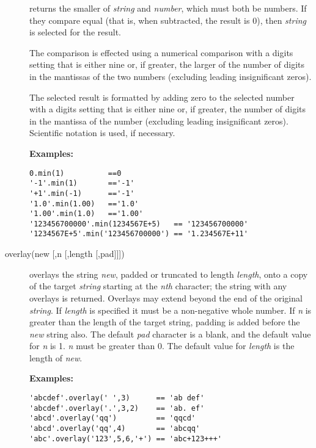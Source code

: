 \begin{description}
returns the smaller of \emph{string} and \emph{number}, which
must both be numbers.  If they compare equal (that is, when subtracted,
the result is 0), then \emph{string} is selected for the result.
 
The comparison is effected using a numerical comparison with a digits
setting that is either nine or, if greater, the larger of the number of
digits in the mantissas of the two numbers (excluding leading
insignificant zeros).
 
The selected result is formatted by adding zero to the selected number
with a digits setting that is either nine or, if greater, the number of
digits in the mantissa of the number (excluding leading insignificant
zeros).
Scientific notation is used, if necessary.
 
\textbf{Examples:}
\begin{lstlisting}
0.min(1)          ==0
'-1'.min(1)       =='-1'
'+1'.min(-1)      =='-1'
'1.0'.min(1.00)   =='1.0'
'1.00'.min(1.0)   =='1.00'
'123456700000'.min(1234567E+5)   == '123456700000'
'1234567E+5'.min('123456700000') == '1.234567E+11'
\end{lstlisting}

\item[overlay(new [,n [,length [,pad{]]]})]\label{refoverlay}
overlays the string \emph{new}, padded or truncated to length
\emph{length}, onto a copy of the target \emph{string} starting
at the \emph{n}\emph{th} character; the string with any overlays is
returned.  Overlays may extend beyond the end of the original
\emph{string}.
If \emph{length} is specified it must be a non-negative whole
number.
If \emph{n} is greater than the length of
the target string, padding is added before the \emph{new} string
also.
The default \emph{pad} character is a blank, and the default value
for \emph{n} is 1.
\emph{n} must be greater than 0.
The default value for \emph{length} is the length of \emph{new}.
 
\textbf{Examples:}
\begin{lstlisting}
'abcdef'.overlay(' ',3)      == 'ab def'
'abcdef'.overlay('.',3,2)    == 'ab. ef'
'abcd'.overlay('qq')         == 'qqcd'
'abcd'.overlay('qq',4)       == 'abcqq'
'abc'.overlay('123',5,6,'+') == 'abc+123+++'
\end{lstlisting}


\end{description}
